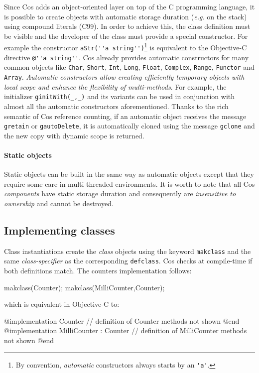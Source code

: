 \documentclass[preprint,10pt]{sigplanconf}
\newcommand{\abbrev}[1]{{\em #1}\xspace}
\newcommand{\eg}{\abbrev{e.g.}}
\newcommand{\ProgLang}[1]{{\sc #1}\xspace}
\newcommand{\Cos}       {\ProgLang{Cos}}
\newcommand{\Objc}      {\ProgLang{Objective-C}}
\newcommand{\code}[1]{\lstinline[language=COS,style=samplecode]|#1|}
\newcommand{\objcode}[1]{\lstinline[language=OBJC,style=samplecode]|#1|}
\begin{document}
Since \Cos adds an object-oriented layer on top of the C programming language, it is possible to create objects with automatic storage duration (\eg on the stack) using compound literals (C99). In order to achieve this, the class definition must be visible and the developer of the class must provide a special constructor. For example the constructor \code{aStr(''a string'')}\footnote{By convention, {\em automatic} constructors always starts by an \code{'a'}.} is equivalent to the \Objc directive \objcode{@''a string''}. \Cos already provides automatic constructors for many common objects like \code{Char}, \code{Short}, \code{Int}, \code{Long}, \code{Float}, \code{Complex}, \code{Range}, \code{Functor} and \code{Array}. {\em Automatic constructors allow creating efficiently temporary objects with local scope and enhance the flexibility of multi-methods}. For example, the initializer \code{ginitWith(_,_)} and its variants can be used in conjunction with almost all the automatic constructors aforementioned. Thanks to the rich semantic of \Cos reference counting, if an automatic object receives the message \code{gretain} or \code{gautoDelete}, it is automatically cloned using the message \code{gclone} and the new copy with dynamic scope is returned.

\paragraph{Static objects}

Static objects can be built in the same way as automatic objects except that they require some care in multi-threaded environments. It is worth to note that all \Cos{} {\em components} have static storage duration and consequently are {\em insensitive to ownership} and cannot be destroyed.

\subsection{Implementing classes}

Class instantiations create the {\em class} objects using the keyword \code{makclass} and the same {\em class-specifier} as the corresponding \code{defclass}. \Cos checks at compile-time if both definitions match. The counters implementation follows:
\begin{COS}
makclass(Counter);
makclass(MilliCounter,Counter);
\end{COS}
which is equivalent in \Objc to:
\begin{OBJC}
@implementation Counter
// definition of Counter methods not shown
@end
@implementation MilliCounter : Counter
// definition of MilliCounter methods not shown
@end
\end{OBJC}
\end{document}
